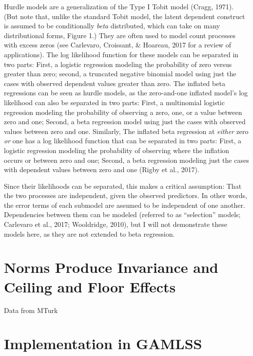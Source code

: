 \documentclass[english,man]{apa6}
\theoremstyle{definition}
\theoremstyle{definition}
\theoremstyle{remark}
\begin{document}
Hurdle models are a generalization of the Type I Tobit model (Cragg,
1971). (But note that, unlike the standard Tobit model, the latent
dependent construct is assumed to be conditionally \emph{beta}
distributed, which can take on many distributional forms, Figure 1.)
They are often used to model count processes with excess zeros (see
Carlevaro, Croissant, \& Hoareau, 2017 for a review of applications).
The log likelihood function for these models can be separated in two
parts: First, a logistic regression modeling the probability of zero
versus greater than zero; second, a truncated negative binomial model
using just the cases with observed dependent values greater than zero.
The inflated beta regressions can be seen as hurdle models, as the
zero-and-one inflated model's log likelihood can also be separated in
two parts: First, a multinomial logistic regression modeling the
probability of observing a zero, one, or a value between zero and one;
Second, a beta regression model using just the cases with observed
values between zero and one. Similarly, The inflated beta regression at
\emph{either} zero \emph{or} one has a log likelihood function that can
be separated in two parts: First, a logistic regression modeling the
probability of observing where the inflation occurs or between zero and
one; Second, a beta regression modeling just the cases with dependent
values between zero and one (Rigby et al., 2017).

Since their likelihoods can be separated, this makes a critical
assumption: That the two processes are independent, given the observed
predictors. In other words, the error terms of each submodel are assumed
to be independent of one another. Dependencies between them can be
modeled (referred to as ``selection'' models; Carlevaro et al., 2017;
Wooldridge, 2010), but I will not demonstrate these models here, as they
are not extended to beta regression.

\section{Norms Produce Invariance and Ceiling and Floor
Effects}\label{norms-produce-invariance-and-ceiling-and-floor-effects}

Data from MTurk

\section{Implementation in GAMLSS}\label{implementation-in-gamlss}
\end{document}

